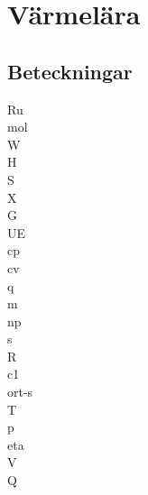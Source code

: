 \chapter{Värmelära}
\section*{Beteckningar}
\acrfull{Ru}\\
\acrfull{mol}\\
\acrfull{W}\\
\acrfull{H}\\
\acrfull{S}\\
\acrfull{X}\\
\acrfull{G}\\
\acrfull{UE}\\
\acrfull{cp}\\
\acrfull{cv}\\
\acrfull{q}\\
\acrfull{m}\\
\acrfull{np}\\
\acrfull{s}\\
\acrfull{R}\\
\acrfull{c1}\\
\acrfull{ort-s}\\
\acrfull{T}\\
\acrfull{p}\\
\acrfull{eta}\\
\acrfull{V}\\
\acrfull{Q}


